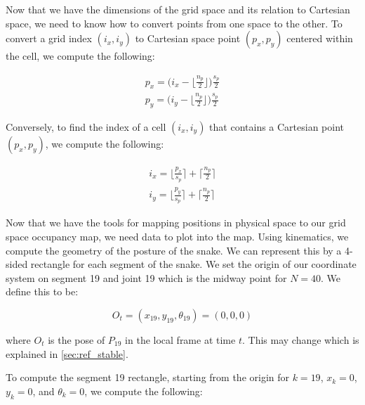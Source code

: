Now that we have the dimensions of the grid space and its relation to Cartesian space, we need to know how to convert points from one space to the other. To convert a grid index $(i_x,i_y)$ to Cartesian space point $(p_x,p_y)$ centered within the cell, we compute the following:


\begin{eqnarray}
\label{eqn:g_to_p}
p_x = \bigg(i_x - \bigg\lfloor\frac{n_p}{2}\bigg\rfloor \bigg)\frac{s_p}{2} \\
p_y = \bigg(i_y - \bigg\lfloor\frac{n_p}{2}\bigg\rfloor \bigg)\frac{s_p}{2}
\end{eqnarray}


Conversely, to find the index of a cell $(i_x,i_y)$ that contains a Cartesian point $(p_x,p_y)$, we compute the following:


\begin{eqnarray}
i_x = \bigg\lfloor \frac{p_x}{s_p} \bigg\rceil + \bigg\lceil\frac{n_p}{2}\bigg\rceil \\
i_y = \bigg\lfloor \frac{p_y}{s_p} \bigg\rceil + \bigg\lceil\frac{n_p}{2}\bigg\rceil
\end{eqnarray}


Now that we have the tools for mapping positions in physical space to our grid space occupancy map, we need data to plot into the map. Using kinematics, we compute the geometry of the posture of the snake. We can represent this by a 4-sided rectangle for each segment of the snake. We set the origin of our coordinate system on segment 19 and joint 19 which is the midway point for $N = 40$. We define this to be:


\begin{equation}
O_t = (x_{19}, y_{19}, \theta_{19}) = (0, 0, 0)
\end{equation}


where $O_t$ is the pose of $P_{19}$ in the local frame at time $t$. This may change which is explained in \autoref{sec:ref_stable}.

To compute the segment 19 rectangle, starting from the origin for $k = 19$, $x_k = 0$, $y_k = 0$, and $\theta_k = 0$, we compute the following:


